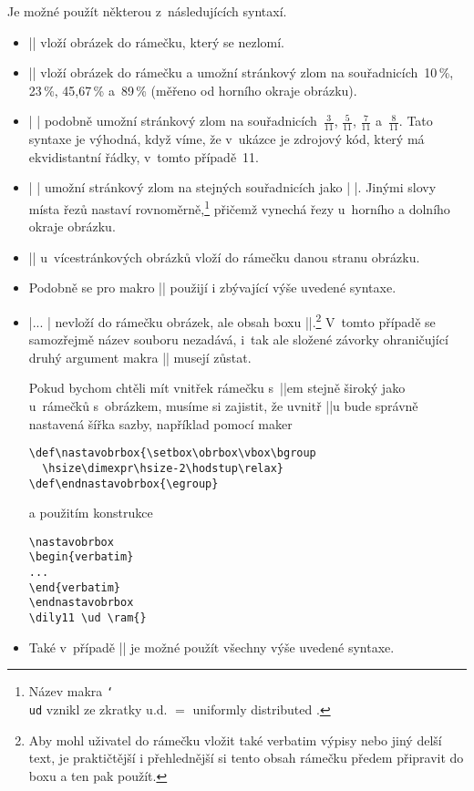 \documentclass[oldcsbabel]{csbulletin}
\def\p#1{\texttt{\char`\\#1}}
\def\uv#1{\char18 #1\char16 }
\begin{document}
Je možné použít některou z~následujících syntaxí.
\begin{itemize}
\item || vloží obrázek do rámečku, který se nezlomí.
\item || vloží obrázek do rámečku a umožní stránkový zlom na souřadnicích~10\,\%, 23\,\%, 45,67\,\% a~89\,\% (měřeno od horního okraje obrázku).
\item | | podobně umožní stránkový zlom na souřadnicích~$\frac{3}{11}$, $\frac{5}{11}$, $\frac{7}{11}$ a~$\frac{8}{11}$. Tato syntaxe je výhodná, když víme, že v~ukázce je zdrojový kód, který má ekvidistantní řádky, v~tomto případě~11.
\item | \ud {}| umožní stránkový zlom na stejných souřadnicích jako | |. Jinými slovy místa řezů nastaví rovnoměrně,\footnote{Název makra \p{ud} vznikl ze zkratky \uv{u.d.}${}={}$\uv{uniformly distributed}.} přičemž vynechá řezy u~horního a dolního okraje obrázku.
\item || u~vícestránkových obrázků vloží do rámečku danou stranu obrázku.
\item Podobně se pro makro |\Ram| použijí i zbývající výše uvedené syntaxe.
\item |\setbox\obrbox\vbox{...} | nevloží do rámečku obrázek, ale obsah boxu |\obrbox|.\footnote{Aby mohl uživatel do rámečku vložit také verbatim výpisy nebo jiný delší text, je praktičtější i přehlednější si tento obsah rámečku předem připravit do boxu a ten pak použít.} V~tomto případě se samozřejmě název souboru nezadává, i~tak ale složené závorky ohraničující druhý argument makra |\ram| musejí zůstat.

Pokud bychom chtěli mít vnitřek rámečku s~|\obrbox|em stejně široký jako u~rámečků s~obrázkem, musíme si zajistit, že uvnitř |\vbox|u bude správně nastavená šířka sazby, například pomocí maker
\begin{Verbatim}[numbers=none]
\def\nastavobrbox{\setbox\obrbox\vbox\bgroup
  \hsize\dimexpr\hsize-2\hodstup\relax}
\def\endnastavobrbox{\egroup}
\end{Verbatim}
a použitím konstrukce
\begin{Verbatim}[numbers=none]
\nastavobrbox
\begin{verbatim}
...
\end{verbatim}
\endnastavobrbox
\dily11 \ud \ram{}
\end{Verbatim}
\item Také v~případě |\setbox\obrbox| je možné použít všechny výše uvedené syntaxe.
\end{itemize}
\end{document}
